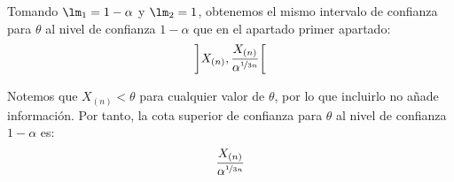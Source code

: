 \begin{ejercicio}
\begin{enumerate}
        Tomando $\lm_1 = 1 - \alpha$ y $\lm_2 = 1$, obtenemos el mismo intervalo de confianza para $\theta$ al nivel de confianza $1 - \alpha$ que en el apartado primer apartado:
        \begin{align*}
            \left]X_{(n)}, \dfrac{X_{(n)}}{\alpha^{\nicefrac{1}{3n}}}\right[
        \end{align*}

        Notemos que $X_{(n)}< \theta$ para cualquier valor de $\theta$, por lo que incluirlo no añade información. Por tanto, la cota superior de confianza para $\theta$ al nivel de confianza $1 - \alpha$ es:
        \begin{align*}
            \dfrac{X_{(n)}}{\alpha^{\nicefrac{1}{3n}}}
        \end{align*}
    \end{enumerate}
\end{ejercicio}



